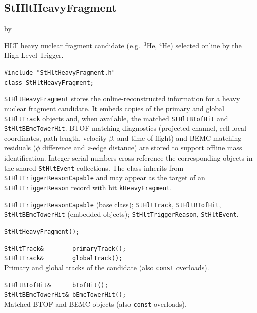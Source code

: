 \documentclass[twoside]{article}
\newcommand{\entrylabel}[1]{\mbox{\textbf{{#1}}}\hfil}%
\newenvironment{entry}
{\begin{list}{}%
    {\renewcommand{\makelabel}{\entrylabel}%
     \setlength{\labelwidth}{90pt}%
     \setlength{\leftmargin}{\labelwidth}
     \advance\leftmargin by \labelsep%
      }%
    }%
  {\end{list}}
\newcommand{\Entrylabel}[1]%
{\raisebox{0pt}[1ex][0pt]{\makebox[\labelwidth][l]%
    {\parbox[t]{\labelwidth}{\hspace{0pt}\textbf{{#1}}}}}}
\newenvironment{Entry}%
{\renewcommand{\entrylabel}{\Entrylabel}\begin{entry}}%
  {\end{entry}}
\begin{document}
\subsection{StHltHeavyFragment}
\label{sec:StHltHeavyFragment}
\begin{Entry}
\item[Summary] HLT heavy nuclear fragment candidate (e.g.\ ${}^3$He,
    ${}^4$He) selected online by the High Level Trigger.
\item[Synopsis]
    \verb+#include "StHltHeavyFragment.h"+\\
    \verb+class StHltHeavyFragment;+\\
\item[Description]
    \texttt{StHltHeavyFragment} stores the online-reconstructed
    information for a heavy nuclear fragment candidate.  It embeds
    copies of the primary and global \texttt{StHltTrack} objects and,
    when available, the matched \texttt{StHltBTofHit} and
    \texttt{StHltBEmcTowerHit}.  BTOF matching diagnostics (projected
    channel, cell-local coordinates, path length, velocity $\beta$, and
    time-of-flight) and BEMC matching residuals ($\phi$ difference and
    $z$-edge distance) are stored to support offline mass
    identification.  Integer serial numbers cross-reference the
    corresponding objects in the shared \texttt{StHltEvent} collections.
    The class inherits from \texttt{StHltTriggerReasonCapable} and may
    appear as the target of an \texttt{StHltTriggerReason} record with
    bit \texttt{kHeavyFragment}.
\item[Related Classes]
    \texttt{StHltTriggerReasonCapable} (base class);
    \texttt{StHltTrack}, \texttt{StHltBTofHit},
    \texttt{StHltBEmcTowerHit} (embedded objects);
    \texttt{StHltTriggerReason}, \texttt{StHltEvent}.
\item[Public\\ Constructors]
    \verb+StHltHeavyFragment();+\\
\item[Public Member\\ Functions]
    \verb+StHltTrack&        primaryTrack();+\\
    \verb+StHltTrack&        globalTrack();+\\
    Primary and global tracks of the candidate (also \texttt{const}
    overloads).

    \verb+StHltBTofHit&      bTofHit();+\\
    \verb+StHltBEmcTowerHit& bEmcTowerHit();+\\
    Matched BTOF and BEMC objects (also \texttt{const} overloads).


\end{Entry}
\end{document}

